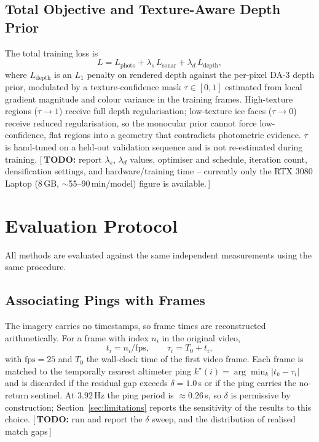\documentclass[conference]{IEEEtran}
\newif\ifdraftnotes\draftnotestrue
\newcommand{\needswork}[1]{%
  \ifdraftnotes\textcolor{red!75!black}{\small[\,\textbf{TODO:} #1\,]}\fi}
\begin{document}
\subsection{Total Objective and Texture-Aware Depth Prior}

The total training loss is
\begin{equation}
L = L_{\text{photo}} + \lambda_s\, L_{\text{sonar}} + \lambda_d\, L_{\text{depth}},
\label{eq:total}
\end{equation}
where $L_{\text{depth}}$ is an $L_1$ penalty on rendered depth against the
per-pixel DA-3 depth prior, modulated by a texture-confidence mask
$\tau \in [0,1]$ estimated from local gradient magnitude and colour variance
in the training frames. High-texture regions ($\tau \to 1$) receive full
depth regularisation; low-texture ice faces ($\tau \to 0$) receive reduced
regularisation, so the monocular prior cannot force low-confidence, flat
regions into a geometry that contradicts photometric evidence. $\tau$ is
hand-tuned on a held-out validation sequence and is not re-estimated during
training. \needswork{report $\lambda_s$, $\lambda_d$ values, optimiser and
schedule, iteration count, densification settings, and hardware/training
time -- currently only the RTX 3080 Laptop (8\,GB, $\sim$55--90\,min/model)
figure is available.}

\section{Evaluation Protocol}
\label{sec:protocol}

All methods are evaluated against the same independent measurements using the same procedure.

\subsection{Associating Pings with Frames}

The imagery carries no timestamps, so frame times are reconstructed
arithmetically. For a frame with index $n_i$ in the original video,
\begin{equation}
  t_i = n_i / \mathrm{fps}, \qquad \tau_i = T_0 + t_i,
\end{equation}
with $\mathrm{fps} = 25$ and $T_0$ the wall-clock time of the first video
frame. Each frame is matched to the temporally nearest altimeter ping
$k^\star(i) = \arg\min_k |t_k - \tau_i|$ and is discarded if the residual gap
exceeds $\delta = 1.0$\,s or if the ping carries the no-return sentinel. At
$3.92$\,Hz the ping period is $\approx 0.26$\,s, so $\delta$ is permissive by
construction; Section~\ref{sec:limitations} reports the sensitivity of the
results to this choice.
\needswork{run and report the $\delta$ sweep, and the distribution of realised
match gaps}
\end{document}
